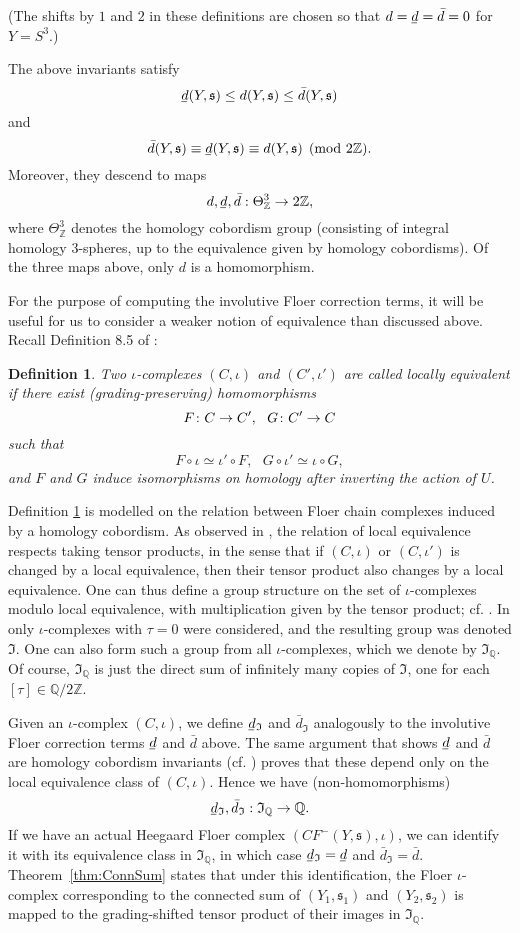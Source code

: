\documentclass[11 pt]{amsart}
\newtheorem {definition}[theorem]{Definition}
\theoremstyle{remark}
\newcommand\Z{\mathbb{Z}}
\newcommand\Q{\mathbb{Q}}
\def\s{\mathfrak s}
\newcommand{\bunderline}[1]{\underline{#1\mkern-2mu}\mkern2mu }
\def\du {\bar{d}}
\def\dl {\bunderline{d}}
\def\CF {\mathit{CF}}
\newcommand \CFm {\CF^-}
\def\inv{\iota}
\def\Inv{\mathfrak{I}}
\newcommand{\co}{\nobreak\mskip2mu\mathpunct{}\nonscript
  \mkern-\thinmuskip{:}\penalty300\mskip6muplus1mu\relax}
\begin{document}
(The shifts by $1$ and $2$ in these definitions are chosen so that $d=\dl=\du=0$ for $Y=S^3$.)

The above invariants satisfy
$$
\dl(Y,\s) \leq  d(Y,\s) \leq \du(Y,\s)$$
and
$$\du(Y, \s) \equiv  \dl(Y, \s) \equiv d(Y, \s) \pmod {2\Z}.$$
Moreover, they descend to maps
$$ d, \dl, \du: \Theta^3_{\Z} \to 2\Z,$$
where $\Theta^3_{\Z}$ denotes the homology cobordism group (consisting of integral homology $3$-spheres, up to the equivalence given by homology cobordisms). Of the three maps above, only $d$ is a homomorphism.

For the purpose of computing the involutive Floer correction terms, it will be useful for us to consider a weaker notion of equivalence than discussed above. Recall Definition 8.5 of \cite{HMZ}:
\begin{definition}
\label{def:localE}
Two $\inv$-complexes $(C, \inv)$ and $(C', \inv')$ are called {\em locally equivalent} if there exist (grading-preserving) homomorphisms
$$ F \co C \to C', \ \ G \co C' \to C$$
such that 
$$F \circ \inv \simeq \inv' \circ F,  \ \ \ G \circ \inv' \simeq \inv \circ G,$$
and $F$ and $G$ induce isomorphisms on homology after inverting the action of $U$.
\end{definition}

Definition \ref{def:localE} is modelled on the relation between Floer chain complexes induced by a homology cobordism. As observed in \cite[Lemma 8.7]{HMZ}, the relation of local equivalence respects taking tensor products, in the sense that if $(C, \inv)$ or $(C, \inv')$ is changed by a local equivalence, then their tensor product also changes by a local equivalence. One can thus define a group structure on the set of $\inv$-complexes modulo local equivalence, with multiplication given by the tensor product; cf. \cite[Section 8.3]{HMZ}. In \cite{HMZ} only $\inv$-complexes with $\tau=0$ were considered, and the resulting group was denoted $\Inv$. One can also form such a group from all $\inv$-complexes, which we denote by $\Inv_{\Q}$. Of course, $\Inv_{\Q}$ is just the direct sum of infinitely many copies of $\Inv$, one for each $[\tau] \in \Q/2\Z$.

Given an $\inv$-complex $(C, \inv)$, we define $\dl_{\Inv}$ and $\du_{\Inv}$ analogously to the involutive Floer correction terms $\dl$ and $\du$ above. The same argument that shows $\dl$ and $\du$ are homology cobordism invariants (cf. \cite[Proposition 5.4]{HMinvolutive}) proves that these depend only on the local equivalence class of $(C, \inv)$. Hence we have (non-homomorphisms)
$$ \dl_{\Inv}, \du_{\Inv}: \Inv_{\Q} \rightarrow \Q. $$
If we have an actual Heegaard Floer complex $(\CFm(Y, \s), \iota)$, we can identify it with its equivalence class in $\Inv_{\Q}$, in which case $\dl_{\Inv} = \dl$ and $\du_{\Inv} = \du$. Theorem~\ref{thm:ConnSum} states that under this identification, the Floer $\inv$-complex corresponding to the connected sum of $(Y_1, \s_1)$ and $(Y_2, \s_2)$ is mapped to the grading-shifted tensor product of their images in $\Inv_{\Q}$. 
\end{document}
